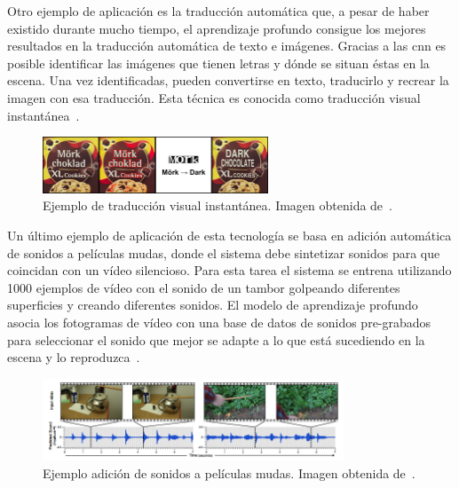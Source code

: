 Otro ejemplo de aplicación es la traducción automática que, a pesar de haber existido durante mucho tiempo, el aprendizaje profundo consigue los mejores resultados en la traducción automática de texto e imágenes. Gracias a las \acrshort{cnn} es posible identificar las imágenes que tienen letras y dónde se situan éstas en la escena. Una vez identificadas, pueden convertirse en texto, traducirlo y recrear la imagen con esa traducción. Esta técnica es conocida como traducción visual instantánea~\cite{traduccion}.

\begin{figure}[H]
	\begin{center}
		\includegraphics[width=0.6\textwidth]{figures/traduccion}
		\caption{Ejemplo de traducción visual instantánea. Imagen obtenida de~\cite{traduccion}.}
	\end{center}
\end{figure}

Un último ejemplo de aplicación de esta tecnología se basa en adición automática de sonidos a películas mudas, donde el sistema debe sintetizar sonidos para que coincidan con un vídeo silencioso. Para esta tarea el sistema se entrena utilizando 1000 ejemplos de vídeo con el sonido de un tambor golpeando diferentes superficies y creando diferentes sonidos. El modelo de aprendizaje profundo asocia los fotogramas de vídeo con una base de datos de sonidos pre-grabados para seleccionar el sonido que mejor se adapte a lo que está sucediendo en la escena y lo reproduzca~\cite{2015arXiv151208512O}.

\begin{figure}[H]
	\begin{center}
		\includegraphics[width=0.8\textwidth]{figures/sonido}
		\caption{Ejemplo adición de sonidos a películas mudas. Imagen obtenida de~\cite{2015arXiv151208512O}.}
	\end{center}
\end{figure}


